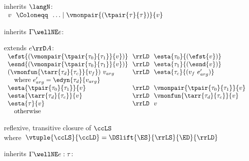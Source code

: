 \begin{flushleft}

\begin{minipage}[t]{\columnwidth}
 inherits $\langN$:\\
$\begin{array}{l@{~~}c@{~~}l}
  v & \Coloneqq & \ldots \mid \vmonpair{(\tpair{\tau}{\tau})}{v}
\end{array}$

\medskip
{} inherits $\Gamma \wellNE e$:
\begin{mathpar}
\end{mathpar}

\medskip
{} extends $e \rrD A$:\\
$\begin{array}{l@{~~}c@{~~}l}
  \efst{(\vmonpair{\tpair{\tau_0}{\tau_1}}{v})} & \rrLD & \esta{\tau_0}{(\efst{v})}
\\
  \esnd{(\vmonpair{\tpair{\tau_0}{\tau_1}}{v})} & \rrLD & \esta{\tau_1}{(\esnd{v})}
\\
  (\vmonfun{\tarr{\tau_d}{\tau_c}}{v_f})~v_{arg} & \rrLD & \esta{\tau_c}{(v_f~e_{arg}')}
\\ \multicolumn{3}{l}{\mbox{\quad where $e_{arg}' = \edyn{\tau_d}{v_{arg}}$}}
\\
  \esta{\tpair{\tau_0}{\tau_1}}{v} & \rrLD & \vmonpair{\tpair{\tau_0}{\tau_1}}{v}
\\
  \esta{\tarr{\tau_d}{\tau_c}}{v} & \rrLD & \vmonfun{\tarr{\tau_d}{\tau_c}}{v}
\\
  \esta{\tau}{v} & \rrLD & v
\\ \multicolumn{3}{l}{\mbox{\quad otherwise}}
\end{array}$

\medskip
{} reflexive, transitive closure of $\ccLS$\\
\mbox{\quad where $\vtuple{\ccLS}{\ccLD} = \DSlift{\ES}{\rrLS}{\ED}{\rrLD}$}
\smallskip
\end{minipage}%
\begin{minipage}[t]{\columnwidth}
 inherits $\Gamma \wellNE e : \tau$:
\begin{mathpar}
\end{mathpar}


\end{minipage}
\end{flushleft}
